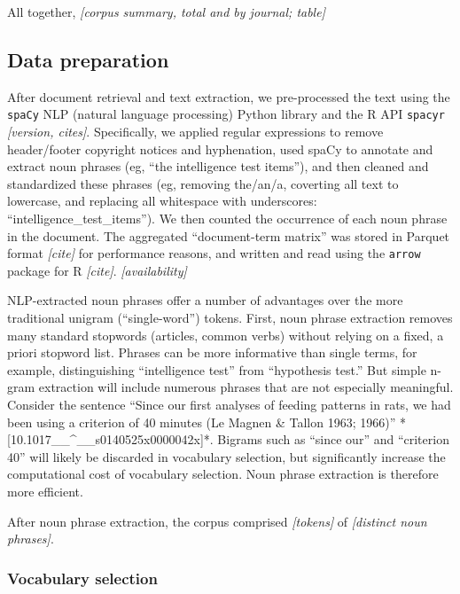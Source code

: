 \documentclass[12pt]{article}
\begin{document}
All together, \emph{{[}corpus summary, total and by journal; table{]}}

\hypertarget{data-preparation}{%
\subsection*{Data preparation}\label{data-preparation}}

After document retrieval and text extraction, we pre-processed the text
using the \texttt{spaCy} NLP (natural language processing) Python
library and the R API \texttt{spacyr} \emph{{[}version, cites{]}}.
Specifically, we applied regular expressions to remove header/footer
copyright notices and hyphenation, used spaCy to annotate and extract
noun phrases (eg, ``the intelligence test items''), and then cleaned and
standardized these phrases (eg, removing the/an/a, coverting all text to
lowercase, and replacing all whitespace with underscores:
``intelligence\_test\_items''). We then counted the occurrence of each
noun phrase in the document. The aggregated ``document-term matrix'' was
stored in Parquet format \emph{{[}cite{]}} for performance reasons, and
written and read using the \texttt{arrow} package for R
\emph{{[}cite{]}}. \emph{{[}availability{]}}

NLP-extracted noun phrases offer a number of advantages over the more
traditional unigram (``single-word'') tokens. First, noun phrase
extraction removes many standard stopwords (articles, common verbs)
without relying on a fixed, a priori stopword list. Phrases can be more
informative than single terms, for example, distinguishing
``intelligence test'' from ``hypothesis test.'' But simple n-gram
extraction will include numerous phrases that are not especially
meaningful. Consider the sentence ``Since our first analyses of feeding
patterns in rats, we had been using a criterion of 40 minutes (Le Magnen
\& Tallon 1963; 1966)'' *{[}10.1017\_\_\^{}\_\_s0140525x0000042x{]}*.
Bigrams such as ``since our'' and ``criterion 40'' will likely be
discarded in vocabulary selection, but significantly increase the
computational cost of vocabulary selection. Noun phrase extraction is
therefore more efficient.

After noun phrase extraction, the corpus comprised \emph{{[}tokens{]}}
of \emph{{[}distinct noun phrases{]}}.

\hypertarget{vocabulary-selection}{%
\subsubsection*{Vocabulary selection}\label{vocabulary-selection}}
\end{document}
